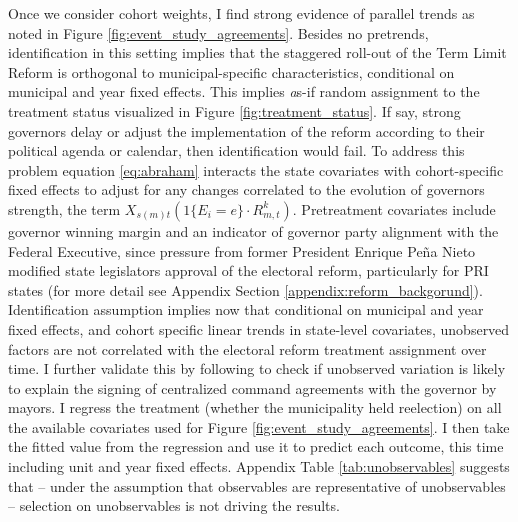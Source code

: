 \documentclass[12pt]{amsart}
\numberwithin{equation}{section}
\theoremstyle{definition}
\theoremstyle{definition}
\theoremstyle{definition}
\begin{document}
Once we consider cohort weights, I find strong evidence of parallel trends as noted in Figure \ref{fig:event_study_agreements}. Besides no pretrends, identification in this setting implies that the staggered roll-out of the Term Limit Reform is orthogonal to municipal-specific characteristics, conditional on municipal and year fixed effects. This implies {\emph as-if} random assignment to the treatment status visualized in Figure \ref{fig:treatment_status}. If say, strong governors delay or adjust the implementation of the reform according to their political agenda or calendar, then identification would fail. To address this problem equation \ref{eq:abraham} interacts the state covariates with cohort-specific fixed effects to adjust for any changes correlated to the evolution of governors strength, the term $X_{s(m)t} (1\{E_i=e\} \cdot R^k_{m,t})$. Pretreatment covariates include governor winning margin and an indicator of governor party alignment with the Federal Executive, since pressure from former President Enrique Peña Nieto modified state legislators approval of the electoral reform, particularly for PRI states (for more detail see Appendix Section \ref{appendix:reform_backgorund}). Identification assumption implies now that conditional on municipal and year fixed effects, and cohort specific linear trends in state-level covariates, unobserved factors are not correlated with the electoral reform treatment assignment over time. I further validate this by following \citet{altonji_etal_2005} to check if unobserved variation is likely to explain the signing of centralized command agreements with the governor by mayors. I regress the treatment (whether the municipality held reelection) on all the available covariates used for Figure \ref{fig:event_study_agreements}. I then take the fitted value from the regression and use it to predict each outcome, this time including unit and year fixed effects. Appendix Table \ref{tab:unobservables} suggests that – under the assumption that observables are representative of unobservables – selection on unobservables is not driving the results. 
\end{document}
